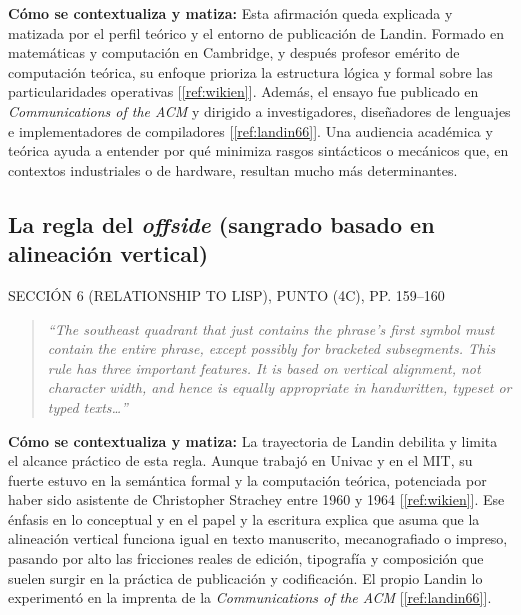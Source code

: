 \documentclass[11pt,twoside,openany]{report}
\newcommand{\etiqueta}[1]{{\fontsize{8}{10}\selectfont\addfontfeature{LetterSpace=8}\MakeUppercase{#1}}}
\newcommand{\fuente}[1]{{\color{acento}[\ref{#1}]}}
\begin{document}
\begin{samepage}
\textbf{Cómo se contextualiza y matiza:} Esta afirmación queda explicada y matizada por el perfil teórico y el entorno de publicación de Landin. Formado en matemáticas y computación en Cambridge, y después profesor emérito de computación teórica, su enfoque prioriza la estructura lógica y formal sobre las particularidades operativas \fuente{ref:wikien}. Además, el ensayo fue publicado en \emph{Communications of the ACM} y dirigido a investigadores, diseñadores de lenguajes e implementadores de compiladores \fuente{ref:landin66}. Una audiencia académica y teórica ayuda a entender por qué minimiza rasgos sintácticos o mecánicos que, en contextos industriales o de hardware, resultan mucho más determinantes.
\end{samepage}

\subsection{La regla del \emph{offside} (sangrado basado en alineación vertical)}

\etiqueta{Sección 6 (Relationship to LISP), punto (4c), pp. 159--160}
\begin{quote}\itshape\sloppy ``The southeast quadrant that just contains the phrase's first symbol must contain the entire phrase, except possibly for bracketed subsegments. This rule has three important features. It is based on vertical alignment, not character width, and hence is equally appropriate in handwritten, typeset or typed texts\ldots''\end{quote}

\begin{samepage}
\textbf{Cómo se contextualiza y matiza:} La trayectoria de Landin debilita y limita el alcance práctico de esta regla. Aunque trabajó en Univac y en el MIT, su fuerte estuvo en la semántica formal y la computación teórica, potenciada por haber sido asistente de Christopher Strachey entre 1960 y 1964 \fuente{ref:wikien}. Ese énfasis en lo conceptual y en el papel y la escritura explica que asuma que la alineación vertical funciona igual en texto manuscrito, mecanografiado o impreso, pasando por alto las fricciones reales de edición, tipografía y composición que suelen surgir en la práctica de publicación y codificación. El propio Landin lo experimentó en la imprenta de la \emph{Communications of the ACM} \fuente{ref:landin66}.
\end{samepage}

\end{document}
